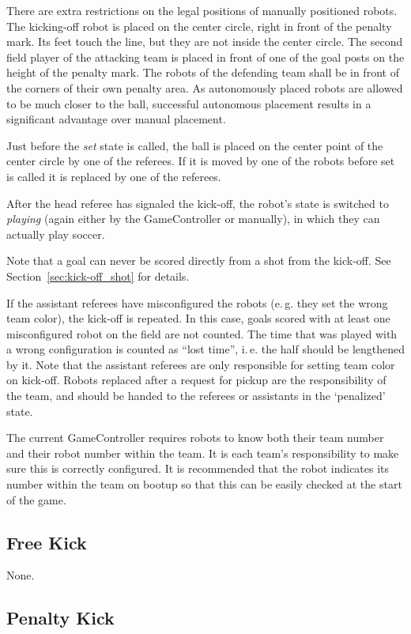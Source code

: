 \documentclass[12pt]{article}
\newcommand{\ie}{\mbox{i.\,e.}\xspace}
\newcommand{\eg}{\mbox{e.\,g.}\xspace}
\begin{document}
There are extra restrictions on the legal positions of manually positioned robots. The kicking-off robot is placed on the center circle, right in front of the penalty mark. Its feet touch the line, but they are not inside the center circle. The second field player of the attacking team is placed in front of one of the goal posts on the height of the penalty mark. The robots of the defending team shall be in front of the corners of their own penalty area. As autonomously placed robots are allowed to be much closer to the ball, successful autonomous placement results in a significant advantage over manual placement.

Just before the \emph{set} state is called, the ball is placed on the center point of the center circle by one of the referees. If it is moved by one of the robots before set is called it is replaced by one of the referees.

After the head referee has signaled the kick-off, the robot's state is switched to \emph{playing} (again either by the GameController or manually), in which they can actually play soccer.

Note that a goal can never be scored directly from a shot from the kick-off. See Section~\ref{sec:kick-off_shot} for details.

If the assistant referees have misconfigured the robots (\eg they set the wrong team color), the kick-off is repeated. In this case, goals scored with at least one misconfigured robot on the field are not counted. The time that was played with a wrong configuration is counted as ``lost time'', \ie the half should be lengthened by it. Note that the assistant referees are only responsible for setting team color on kick-off. Robots replaced after a request for pickup are the responsibility of the team, and should be handed to the referees or assistants in the `penalized' state.

The current GameController requires robots to know both their team number and their robot number within the team. It is each team's responsibility to make sure this is correctly configured. It is recommended that the robot indicates its number within the team on bootup so that this can be easily checked at the start of the game. 

\subsection{Free Kick}

None.

\subsection{Penalty Kick}
\label{sec:penalty_kick}
\end{document}
